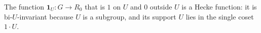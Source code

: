 The function $\mathbf 1_U\colon G\to R_0$ that is $1$ on $U$ and $0$ outside $U$ is a Hecke function: it is bi-$U$-invariant because $U$ is a subgroup, and its support $U$ lies in the single coset $1\cdot U$.
